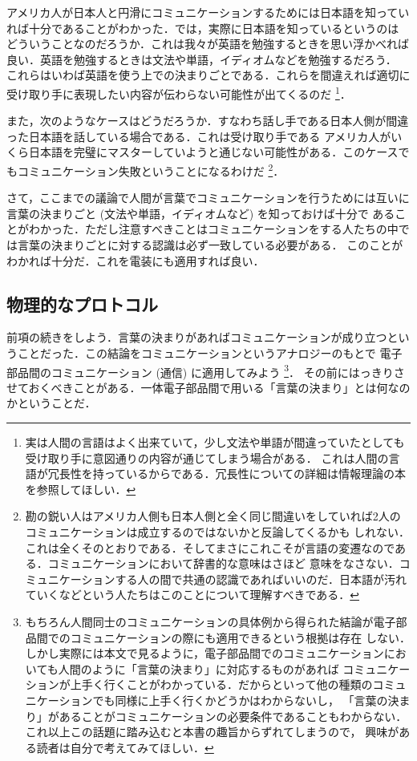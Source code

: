 \documentclass[dvipdfmx]{jsbook}
\begin{document}
  アメリカ人が日本人と円滑にコミュニケーションするためには日本語を知っていれば十分であることがわかった．では，実際に日本語を知っているというのは
  どういうことなのだろうか．これは我々が英語を勉強するときを思い浮かべれば良い．英語を勉強するときは文法や単語，イディオムなどを勉強するだろう．
  これらはいわば英語を使う上での決まりごとである．これらを間違えれば適切に受け取り手に表現したい内容が伝わらない可能性が出てくるのだ
  \footnote{実は人間の言語はよく出来ていて，少し文法や単語が間違っていたとしても受け取り手に意図通りの内容が通じてしまう場合がある．
  これは人間の言語が冗長性を持っているからである．冗長性についての詳細は情報理論の本を参照してほしい．}．

  また，次のようなケースはどうだろうか．すなわち話し手である日本人側が間違った日本語を話している場合である．これは受け取り手である
  アメリカ人がいくら日本語を完璧にマスターしていようと通じない可能性がある．このケースでもコミュニケーション失敗ということになるわけだ
  \footnote{勘の鋭い人はアメリカ人側も日本人側と全く同じ間違いをしていれば2人のコミュニケーションは成立するのではないかと反論してくるかも
  しれない．これは全くそのとおりである．そしてまさにこれこそが言語の変遷なのである．コミュニケーションにおいて辞書的な意味はさほど
  意味をなさない．コミュニケーションする人の間で共通の認識であればいいのだ．日本語が汚れていくなどという人たちはこのことについて理解すべきである．}．

  さて，ここまでの議論で人間が言葉でコミュニケーションを行うためには互いに言葉の決まりごと (文法や単語，イディオムなど) を知っておけば十分で
  あることがわかった．ただし注意すべきことはコミュニケーションをする人たちの中では言葉の決まりごとに対する認識は必ず一致している必要がある．
  このことがわかれば十分だ．これを電装にも適用すれば良い．

\subsection{物理的なプロトコル}

  前項の続きをしよう．言葉の決まりがあればコミュニケーションが成り立つということだった．この結論をコミュニケーションというアナロジーのもとで
  電子部品間のコミュニケーション (通信) に適用してみよう
  \footnote{もちろん人間同士のコミュニケーションの具体例から得られた結論が電子部品間でのコミュニケーションの際にも適用できるという根拠は存在
  しない．しかし実際には本文で見るように，電子部品間でのコミュニケーションにおいても人間のように「言葉の決まり」に対応するものがあれば
  コミュニケーションが上手く行くことがわかっている．だからといって他の種類のコミュニケーションでも同様に上手く行くかどうかはわからないし，
  「言葉の決まり」があることがコミュニケーションの必要条件であることもわからない．これ以上この話題に踏み込むと本書の趣旨からずれてしまうので，
  興味がある読者は自分で考えてみてほしい．}．
  その前にはっきりさせておくべきことがある．一体電子部品間で用いる「言葉の決まり」とは何なのかということだ．
\end{document}
